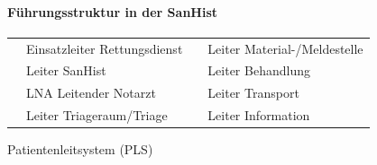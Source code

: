 \documentclass{article}
\begin{document}
\paragraph{F\"uhrungsstruktur in der SanHist}
\begin{center}
\tablehead{}\begin{supertabular}{m{2.4459999cm}m{4.0030003cm}m{2.299cm}m{4.1520004cm}}
{%
 \par}

 &
{\mdseries Einsatzleiter Rettungsdienst}

 &
{%
 \par}

 &
{\mdseries Leiter Material-/Meldestelle}

\\
{%
 \par}

 &
{\mdseries Leiter SanHist}

 &
{%
 \par}

 &
{\mdseries Leiter Behandlung}

\\
{%
 \par}

 &
{\mdseries LNA Leitender Notarzt}

 &
{%
 \par}

 &
{\mdseries Leiter Transport}

\\
{%
 \par}

 &
{\mdseries Leiter Triageraum/Triage}

 &
{%
 \par}

 &
{\mdseries Leiter Information}

\\
\end{supertabular}
\end{center}
{\mdseries\color[rgb]{0.0,0.0,0.5019608}
Patientenleitsystem (PLS)}
\end{document}
